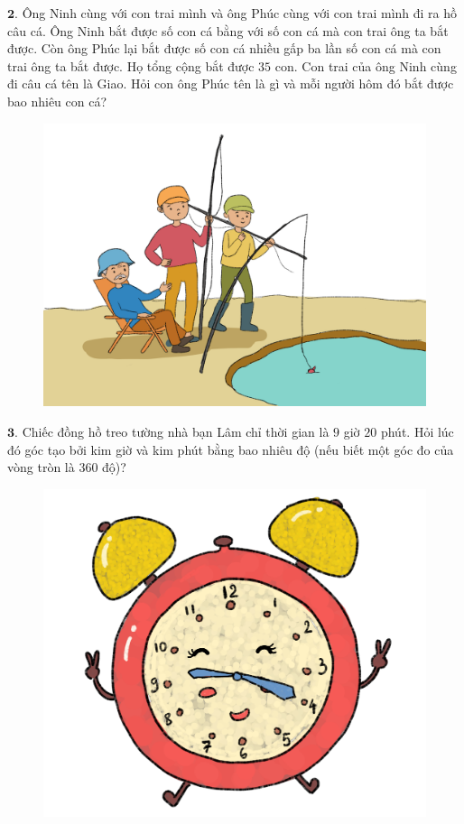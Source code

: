 	\begin{multicols}{2}
	$\pmb{2.}$ Ông Ninh cùng với con trai mình và ông Phúc cùng với con trai mình đi ra hồ câu cá. Ông Ninh bắt được số con cá bằng với số con cá mà con trai ông ta bắt được. Còn ông Phúc lại bắt được số con cá nhiều gấp ba lần số con cá mà con trai ông ta bắt được. Họ tổng cộng bắt được $35$ con. Con trai của ông Ninh cùng đi câu cá tên là Giao. Hỏi con ông Phúc tên là gì và mỗi người hôm đó bắt được bao nhiêu con cá?
	\begin{figure}[H]
		\centering
		\vspace*{-5pt}
		\captionsetup{labelformat= empty, justification=centering}
		\includegraphics[width=1\linewidth]{bai2}
		\vspace*{-15pt}
	\end{figure}
	$\pmb{3.}$ Chiếc đồng hồ treo tường nhà bạn Lâm chỉ thời gian là $9$ giờ $20$ phút. Hỏi lúc đó góc tạo bởi kim giờ và kim phút bằng bao nhiêu độ (nếu biết một  góc đo của vòng tròn là $360$ độ)?
	\begin{figure}[H]
		\centering
		\vspace*{-5pt}
		\captionsetup{labelformat= empty, justification=centering}
		\includegraphics[width=1\linewidth]{bai3}

\end{figure}
\end{multicols}
